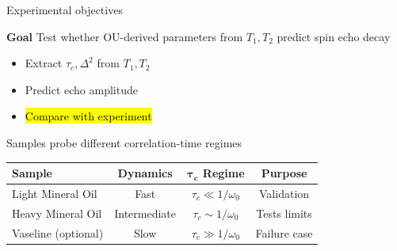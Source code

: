 \documentclass[aspectratio=169,xcolor=dvipsnames]{beamer}
\begin{document}

\begin{frame}{Experimental objectives}
    \begin{alertblock}{\textbf{Goal}}
        Test whether OU-derived parameters from $T_1,T_2$ predict spin echo decay
        \begin{itemize}
            \item[$\bullet$] Extract $\tau_c,\Delta^2$ from $T_1,T_2$
            \item[$\bullet$] Predict echo amplitude
            \item[$\bullet$] \hl{Compare with experiment}
        \end{itemize}
    \end{alertblock}
    Samples probe different correlation-time regimes
    \begin{table}[h]
        \centering
        \begin{tabular}{lccc}
            \hline
            \textbf{Sample} & \textbf{Dynamics} & $\boldsymbol{\tau_c}$ \textbf{Regime} & \textbf{Purpose} \\
            \hline
            Light Mineral Oil 
            & Fast 
            & $\tau_c \ll 1/\omega_0$ 
            & Validation \\

            Heavy Mineral Oil 
            & Intermediate
            & $\tau_c \sim 1/\omega_0$ 
            & Tests limits \\

            Vaseline (optional) 
            & Slow
            & $\tau_c \gg 1/\omega_0$ 
            & Failure case \\
            \hline
        \end{tabular}
    \end{table}
\end{frame}

\end{document}
